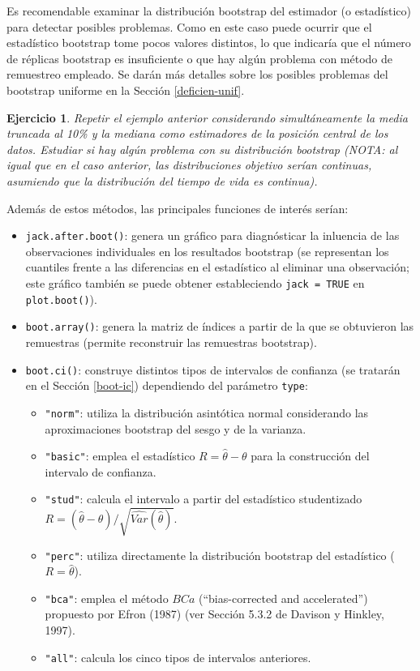 \documentclass[
]{book}
\theoremstyle{break}
\newtheorem{exercise}{Ejercicio}[chapter]
\theoremstyle{nonumberplain}
\begin{document}
Es recomendable examinar la distribución bootstrap del estimador (o estadístico) para detectar posibles problemas.
Como en este caso puede ocurrir que el estadístico bootstrap tome pocos valores distintos, lo que indicaría que el número de réplicas bootstrap es insuficiente o que hay algún problema con método de remuestreo empleado.
Se darán más detalles sobre los posibles problemas del bootstrap uniforme en la Sección \ref{deficien-unif}.

\begin{exercise}
\protect\hypertarget{exr:boot-simul-mediana}{}\label{exr:boot-simul-mediana}
Repetir el ejemplo anterior considerando simultáneamente la media truncada al 10\% y la mediana como estimadores de la posición central de los datos. Estudiar si hay algún problema con su distribución bootstrap (NOTA: al igual que en el caso anterior, las distribuciones objetivo serían continuas, asumiendo que la distribución del tiempo de vida es continua).
\end{exercise}

Además de estos métodos, las principales funciones de interés serían:

\begin{itemize}
\item
  \texttt{jack.after.boot()}: genera un gráfico para diagnósticar la inluencia
  de las observaciones individuales en los resultados bootstrap
  (se representan los cuantiles frente a las diferencias en el estadístico
  al eliminar una observación; este gráfico también se puede obtener estableciendo
  \texttt{jack\ =\ TRUE} en \texttt{plot.boot()}).
\item
  \texttt{boot.array()}: genera la matriz de índices a partir de la que se obtuvieron las remuestras (permite reconstruir las remuestras bootstrap).
\item
  \texttt{boot.ci()}: construye distintos tipos de intervalos de confianza
  (se tratarán en el Sección \ref{boot-ic}) dependiendo del parámetro \texttt{type}:

  \begin{itemize}
  \item
    \texttt{"norm"}: utiliza la distribución asintótica normal considerando las
    aproximaciones bootstrap del sesgo y de la varianza.
  \item
    \texttt{"basic"}: emplea el estadístico \(R = \hat \theta - \theta\) para la
    construcción del intervalo de confianza.
  \item
    \texttt{"stud"}: calcula el intervalo a partir del estadístico studentizado
    \(R = \left( \hat \theta - \theta \right) / \sqrt{\widehat{Var}(\hat \theta)}\).
  \item
    \texttt{"perc"}: utiliza directamente la distribución bootstrap del estadístico
    (\(R = \hat \theta\)).
  \item
    \texttt{"bca"}: emplea el método \(BCa\) (``bias-corrected and accelerated'')
    propuesto por Efron (1987) (ver Sección 5.3.2 de Davison y Hinkley, 1997).
  \item
    \texttt{"all"}: calcula los cinco tipos de intervalos anteriores.
  \end{itemize}
\end{itemize}
\end{document}

